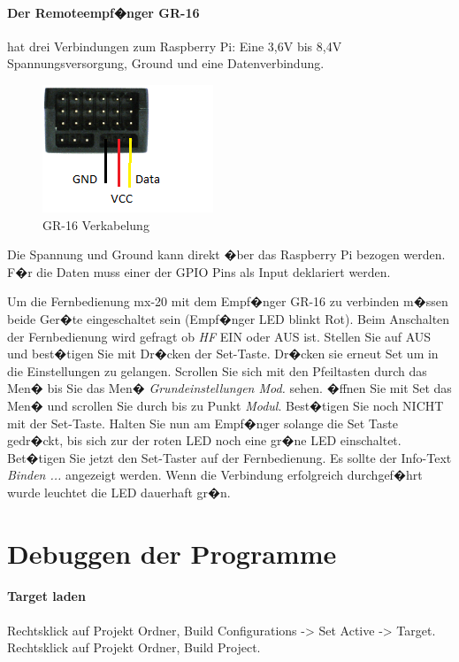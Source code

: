 \paragraph{Der Remoteempf�nger GR-16} hat drei Verbindungen zum Raspberry Pi:
Eine 3,6V bis 8,4V Spannungsversorgung, Ground und eine Datenverbindung.
\label{Receiver}
\begin{figure}[H]
	\centering
	\includegraphics{fig/GR-16.png}
	\caption[GR-16 Verkabelung]{GR-16 Verkabelung\protect\footnotemark}
\end{figure}
Die Spannung und Ground kann direkt �ber das Raspberry Pi bezogen werden. F�r die Daten muss einer der GPIO Pins als Input deklariert werden.

Um die Fernbedienung mx-20 mit dem Empf�nger GR-16 zu verbinden m�ssen beide Ger�te eingeschaltet sein (Empf�nger LED blinkt Rot). Beim Anschalten der Fernbedienung wird gefragt ob \emph{HF} EIN oder AUS ist. Stellen Sie auf AUS und best�tigen Sie mit Dr�cken der Set-Taste. Dr�cken sie erneut Set um in die Einstellungen zu gelangen. Scrollen Sie sich mit den Pfeiltasten durch das Men� bis Sie das Men� \emph{Grundeinstellungen Mod.} sehen. �ffnen Sie mit Set das Men� und scrollen Sie durch bis zu Punkt \emph{Modul}. Best�tigen Sie noch NICHT mit der Set-Taste. 
Halten Sie nun am Empf�nger solange die Set Taste gedr�ckt, bis sich zur der roten LED noch eine gr�ne LED einschaltet. Bet�tigen Sie jetzt den Set-Taster auf der Fernbedienung. Es sollte der Info-Text \emph{Binden ...} angezeigt werden.
Wenn die Verbindung erfolgreich durchgef�hrt wurde leuchtet die LED dauerhaft gr�n. \cite{doc:gt-16}

\newpage

\section{Debuggen der Programme}

\paragraph{Target laden}
Rechtsklick auf Projekt Ordner, \newline
Build Configurations -> Set Active -> Target.\newline
Rechtsklick auf Projekt Ordner, Build Project.

